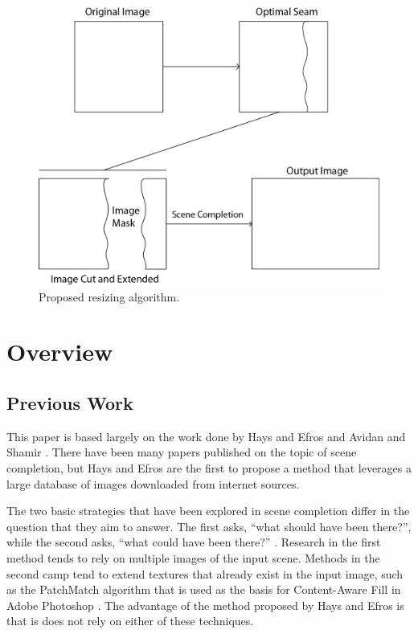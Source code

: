 \documentclass[11pt]{amsart}
\begin{document}
\begin{figure}[htbp]
\begin{center}
\includegraphics[scale=.5]{seamOverview.png}
\caption{Proposed resizing algorithm.}
\label{resize}
\end{center}
\end{figure}

\section{Overview} 
\subsection{Previous Work}
This paper is based largely on the work done by Hays and Efros \cite{Hays:2007} and
Avidan and Shamir \cite{Avidan:2007}. There have been many papers published on the
topic of scene completion, but Hays and Efros are the first to propose a method that leverages
a large database of images downloaded from internet sources. 

The two basic strategies that have been explored in scene completion differ in the question that
they aim to answer. The first asks, ``what should have been there?'', while the second asks, ``what 
could have been there?'' \cite{Hays:2007}. Research in the first method tends to rely on multiple images of the input scene. Methods in the second camp tend to extend textures that already exist in the input image, such as the PatchMatch algorithm that is used as the basis for Content-Aware Fill in
Adobe Photoshop \cite{Barnes:2009}. The advantage of the method proposed by Hays and Efros is that is does not rely on either of these techniques. 
\end{document}
